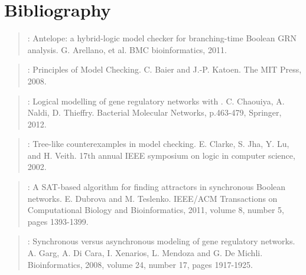 \documentclass[letterpaper,10pt,english]{sphinxmanual}
\begin{document}
\chapter{Bibliography}
\label{\detokenize{Bibliography:bibliography}}\label{\detokenize{Bibliography::doc}}\label{\detokenize{Bibliography:arellano2011}}\begin{quote}

:
Antelope: a hybrid-logic model checker for branching-time Boolean GRN analysis.
G. Arellano, et al.
BMC bioinformatics, 2011.
\end{quote}
\label{\detokenize{Bibliography:baier2008}}\begin{quote}

:
Principles of Model Checking.
C. Baier and J.-P. Katoen.
The MIT Press, 2008.
\end{quote}
\label{\detokenize{Bibliography:chaouiya2012}}\begin{quote}

:
Logical modelling of gene regulatory networks with .
C. Chaouiya, A. Naldi, D. Thieffry.
Bacterial Molecular Networks, p.463-479, Springer, 2012.
\end{quote}
\label{\detokenize{Bibliography:clarke2002}}\begin{quote}

:
Tree-like counterexamples in model checking.
E. Clarke, S. Jha, Y. Lu, and H. Veith.
17th annual IEEE symposium on logic in computer science, 2002.
\end{quote}
\label{\detokenize{Bibliography:dubrova2011}}\begin{quote}

:
A SAT-based algorithm for finding attractors in synchronous Boolean networks.
E. Dubrova and M. Teslenko.
IEEE/ACM Transactions on Computational Biology and Bioinformatics, 2011, volume 8, number 5, pages 1393-1399.
\end{quote}
\label{\detokenize{Bibliography:garg2008}}\begin{quote}

:
Synchronous versus asynchronous modeling of gene regulatory networks.
A. Garg, A. Di Cara, I. Xenarios, L. Mendoza and G. De Michli.
Bioinformatics, 2008, volume 24, number 17, pages 1917-1925.
\end{quote}
\end{document}
